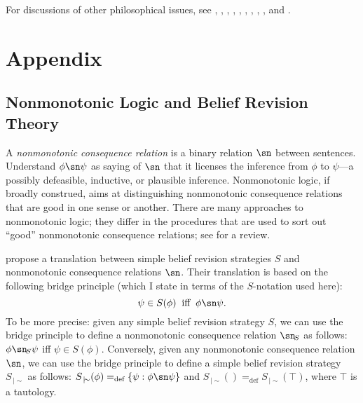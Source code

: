 
For discussions of other philosophical issues, see \citet{levi1983enterprise}, \citet{levi1991fixation}, \citet{levi2004mild}, \citet{gardenfors1988knowledge}, \citet{rott2000two}, \citet{rott2001change}, \citet{hansson1999textbook}, \citet{hansson2003ten}, \citet{gillies2004epistemic}, and \citet{genin2015theory}. 


\section{Appendix}

\subsection{Nonmonotonic Logic and Belief Revision Theory}\label{app-trans}

A {\em nonmonotonic consequence relation} is a binary relation $\sn$ between sentences. Understand $\phi \sn \psi$ as saying of $\sn$ that it licenses the inference from $\phi$ to $\psi$---a possibly defeasible, inductive, or plausible inference. Nonmonotonic logic, if broadly construed, aims at distinguishing nonmonotonic consequence relations that are good in one sense or another. There are many approaches to nonmonotonic logic; they differ in the procedures that are used to sort out ``good'' nonmonotonic consequence relations; see \citet*{brewka2008nonmonotonic} for a review.

\citet*{makinson1991relations} propose a translation between simple belief revision strategies $S$ and nonmonotonic consequence relations $\sn$. Their translation is based on the following bridge principle (which I state in terms of the $S$-notation used here): 
	$$\psi \in S(\phi) \;\;\text{iff}\;\; \phi \sn \psi.$$ 
To be more precise: given any simple belief revision strategy $S$, we can use the bridge principle to define a nonmonotonic consequence relation $\sn_{\!S}$ as follows: $\phi \sn_{\!S} \psi$ iff $\psi \in S(\phi)$. Conversely, given any nonmonotonic consequence relation $\sn$, we can use the bridge principle to define a simple belief revision strategy $S_{\,|\!\sim}$ as follows: $S_{\,|\!\sim}(\phi) =_\text{def} \{\psi: \phi \sn \psi\}$ and $S_{\,|\!\sim}() =_\text{def} S_{\,|\!\sim}(\top)$, where $\top$ is a tautology. 

